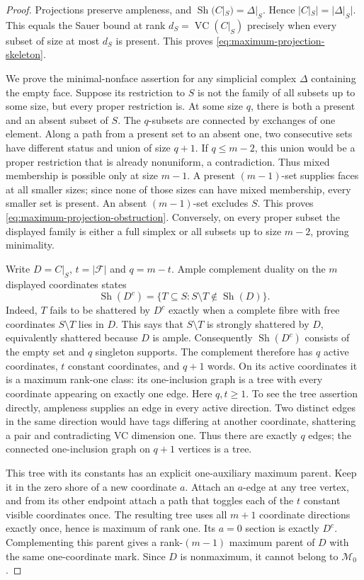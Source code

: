 \documentclass[11pt]{article}
\theoremstyle{definition}
\newcommand{\Sh}{\operatorname{Sh}}
\newcommand{\VC}{\operatorname{VC}}
\begin{document}
\begin{proof}
Projections preserve ampleness, and
$\Sh(C|_S)=\Delta|_S$. Hence $\lvert C|_S\rvert=\lvert\Delta|_S\rvert$. This equals the Sauer
bound at rank $d_S=\VC(C|_S)$ precisely when every subset of size at most
$d_S$ is present. This proves \eqref{eq:maximum-projection-skeleton}.

We prove the minimal-nonface assertion for any simplicial complex $\Delta$
containing the empty face. Suppose its restriction to $S$ is not the family
of all subsets up to some size, but every proper restriction is. At some
size $q$, there is both a present and an absent subset of $S$. The $q$-subsets
are connected by exchanges of one element. Along a path from a present set
to an absent one, two consecutive sets have different status and union of
size $q+1$. If $q\le m-2$, this union would be a proper restriction that
is already nonuniform, a contradiction. Thus mixed membership is possible
only at size $m-1$. A present $(m-1)$-set supplies faces at all smaller
sizes; since none of those sizes can have mixed membership, every smaller
set is present. An absent $(m-1)$-set excludes $S$. This proves
\eqref{eq:maximum-projection-obstruction}. Conversely, on every proper
subset the displayed family is either a full simplex or all subsets up to
size $m-2$, proving minimality.

Write $D=C|_S$, $t=|\mathcal F|$ and $q=m-t$. Ample complement duality
on the $m$ displayed coordinates states
\[
\Sh(D^c)=\{T\subseteq S:S\setminus T\notin\Sh(D)\}.
\]
Indeed, $T$ fails to be shattered by $D^c$ exactly when a complete
fibre with free coordinates $S\setminus T$ lies in $D$. This says that
$S\setminus T$ is strongly shattered by $D$, equivalently shattered
because $D$ is ample.
Consequently $\Sh(D^c)$ consists of the empty set and $q$ singleton
supports. The complement therefore has $q$ active coordinates, $t$ constant
coordinates, and $q+1$ words. On its active coordinates it is a maximum
rank-one class: its one-inclusion graph is a tree with every coordinate
appearing on exactly one edge. Here $q,t\ge1$.
To see the tree assertion directly, ampleness supplies an edge in every
active direction. Two distinct edges in the same direction would have tags
differing at another coordinate, shattering a pair and contradicting VC
dimension one. Thus there are exactly $q$ edges; the connected one-inclusion
graph on $q+1$ vertices is a tree.

This tree with its constants has an explicit one-auxiliary maximum parent.
Keep it in the zero shore of a new coordinate $a$. Attach an $a$-edge at
any tree vertex, and from its other endpoint attach a path that toggles each
of the $t$ constant visible coordinates once. The resulting tree uses all
$m+1$ coordinate directions exactly once, hence is maximum of rank one.
Its $a=0$ section is exactly $D^c$. Complementing this parent gives a
rank-$(m-1)$ maximum parent of $D$ with the same one-coordinate mark.
Since $D$ is nonmaximum, it cannot belong to $\mathcal M_0$.
\end{proof}
\end{document}
